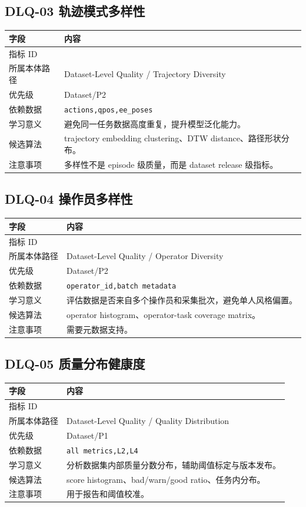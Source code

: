 \documentclass[UTF8,zihao=-4,oneside,openany]{ctexrep}
\newcommand{\Code}[1]{\texttt{#1}}
\newcommand{\MID}[1]{\texttt{\seqsplit{#1}}}
\begin{document}
\subsection{DLQ-03 轨迹模式多样性}

\begin{longtable}{L{3.6cm} L{9.6cm}}
\toprule
字段 & 内容 \\
\midrule
指标 ID & \MID{DLQ-03} \\
所属本体路径 & Dataset-Level Quality / Trajectory Diversity \\
优先级 & Dataset/P2 \\
依赖数据 & \Code{actions,qpos,ee\_poses} \\
学习意义 & 避免同一任务数据高度重复，提升模型泛化能力。 \\
候选算法 & trajectory embedding clustering、DTW distance、路径形状分布。 \\
注意事项 & 多样性不是 episode 级质量，而是 dataset release 级指标。 \\
\bottomrule
\end{longtable}

\subsection{DLQ-04 操作员多样性}

\begin{longtable}{L{3.6cm} L{9.6cm}}
\toprule
字段 & 内容 \\
\midrule
指标 ID & \MID{DLQ-04} \\
所属本体路径 & Dataset-Level Quality / Operator Diversity \\
优先级 & Dataset/P2 \\
依赖数据 & \Code{operator\_id,batch metadata} \\
学习意义 & 评估数据是否来自多个操作员和采集批次，避免单人风格偏置。 \\
候选算法 & operator histogram、operator-task coverage matrix。 \\
注意事项 & 需要元数据支持。 \\
\bottomrule
\end{longtable}

\subsection{DLQ-05 质量分布健康度}

\begin{longtable}{L{3.6cm} L{9.6cm}}
\toprule
字段 & 内容 \\
\midrule
指标 ID & \MID{DLQ-05} \\
所属本体路径 & Dataset-Level Quality / Quality Distribution \\
优先级 & Dataset/P1 \\
依赖数据 & \Code{all metrics,L2,L4} \\
学习意义 & 分析数据集内部质量分数分布，辅助阈值标定与版本发布。 \\
候选算法 & score histogram、bad/warn/good ratio、任务内分布。 \\
注意事项 & 用于报告和阈值校准。 \\
\bottomrule
\end{longtable}
\end{document}
